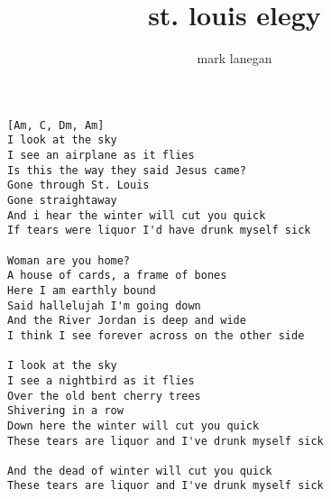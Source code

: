 \author{mark lanegan}
\title{st. louis elegy}
\maketitle
\begin{verbatim}
[Am, C, Dm, Am]
I look at the sky
I see an airplane as it flies
Is this the way they said Jesus came?
Gone through St. Louis
Gone straightaway
And i hear the winter will cut you quick
If tears were liquor I'd have drunk myself sick

Woman are you home?
A house of cards, a frame of bones
Here I am earthly bound
Said hallelujah I'm going down
And the River Jordan is deep and wide
I think I see forever across on the other side

I look at the sky
I see a nightbird as it flies
Over the old bent cherry trees
Shivering in a row
Down here the winter will cut you quick
These tears are liquor and I've drunk myself sick

And the dead of winter will cut you quick
These tears are liquor and I've drunk myself sick
\end{verbatim}